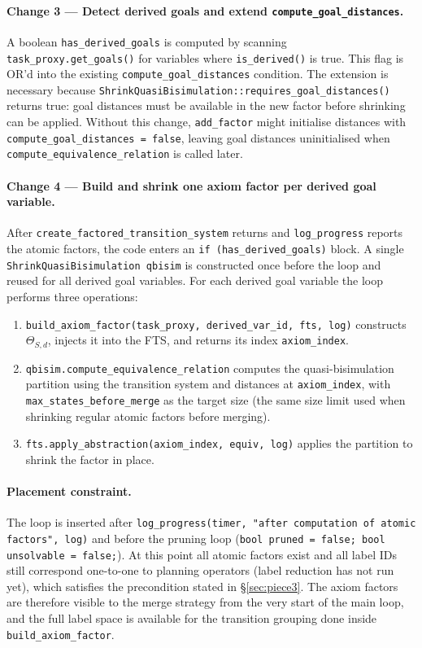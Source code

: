 \documentclass[11pt,a4paper]{article}
\begin{document}
\paragraph{Change 3 — Detect derived goals and extend \texttt{compute\_goal\_distances}.}
A boolean \texttt{has\_derived\_goals} is computed by scanning
\texttt{task\_proxy.get\_goals()} for variables where \texttt{is\_derived()} is
true.  This flag is OR'd into the existing \texttt{compute\_goal\_distances}
condition.  The extension is necessary because
\texttt{ShrinkQuasiBisimulation::requires\_goal\_distances()} returns true:
goal distances must be available in the new factor before shrinking can be
applied.  Without this change, \texttt{add\_factor} might initialise distances
with \texttt{compute\_goal\_distances = false}, leaving goal distances
uninitialised when \texttt{compute\_equivalence\_relation} is called later.

\paragraph{Change 4 — Build and shrink one axiom factor per derived goal variable.}
After \texttt{create\_factored\_transition\_system} returns and
\texttt{log\_progress} reports the atomic factors, the code enters an
\texttt{if (has\_derived\_goals)} block.  A single
\texttt{ShrinkQuasiBisimulation qbisim} is constructed once before the loop
and reused for all derived goal variables.  For each derived goal variable the
loop performs three operations:

\begin{enumerate}
  \item \texttt{build\_axiom\_factor(task\_proxy, derived\_var\_id, fts, log)}
        constructs $\Theta_{S,d}$, injects it into the FTS, and returns its
        index \texttt{axiom\_index}.
  \item \texttt{qbisim.compute\_equivalence\_relation} computes the
        quasi-bisimulation partition using the transition system and distances
        at \texttt{axiom\_index}, with \texttt{max\_states\_before\_merge} as
        the target size (the same size limit used when shrinking regular atomic
        factors before merging).
  \item \texttt{fts.apply\_abstraction(axiom\_index, equiv, log)} applies the
        partition to shrink the factor in place.
\end{enumerate}

\paragraph{Placement constraint.}
The loop is inserted after
\texttt{log\_progress(timer, "after computation of atomic factors", log)}
and before the pruning loop (\texttt{bool pruned = false; bool unsolvable = false;}).
At this point all atomic factors exist and all label IDs still correspond
one-to-one to planning operators (label reduction has not run yet), which
satisfies the precondition stated in \S\ref{sec:piece3}.  The axiom factors
are therefore visible to the merge strategy from the very start of the main
loop, and the full label space is available for the transition grouping done
inside \texttt{build\_axiom\_factor}.
\end{document}
